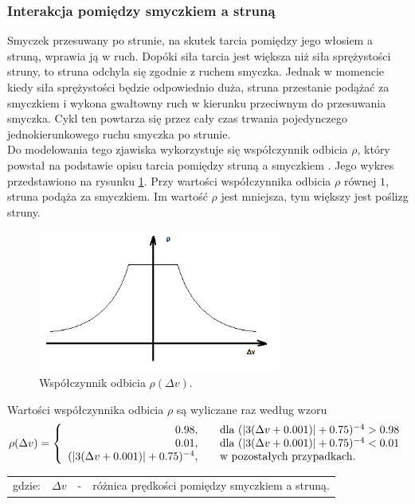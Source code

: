 \subsubsection{Interakcja pomiędzy smyczkiem a struną}
Smyczek przesuwany po strunie, na skutek tarcia pomiędzy jego włosiem a struną, wprawia ją w ruch. Dopóki siła tarcia jest większa niż siła sprężystości struny, to struna odchyla się zgodnie z ruchem smyczka. Jednak w momencie kiedy siła sprężystości będzie odpowiednio duża, struna przestanie podążać za smyczkiem i wykona gwałtowny ruch w kierunku przeciwnym do przesuwania smyczka.  Cykl ten powtarza się przez cały czas trwania pojedynczego jednokierunkowego ruchu smyczka po strunie.  \\
Do modelowania tego zjawiska wykorzystuje się współczynnik odbicia $\rho$, który powstał na podstawie opisu tarcia pomiędzy struną a smyczkiem \cite{bowed_3}. Jego wykres przedstawiono na rysunku \ref{rys:tarcie}. Przy wartości współczynnika odbicia $\rho$ równej $1$, struna podąża za smyczkiem. Im wartość $\rho$ jest mniejsza, tym większy jest poślizg struny.
\begin{figure}[H]
	\centering
	\includegraphics[width=8cm]{grafiki/tarcie2}
	\captionsetup{justification=centering}
	\caption{Współczynnik odbicia $\rho(\Delta v)$.}
	\label{rys:tarcie}
\end{figure}
Wartości współczynnika odbicia $\rho$ są wyliczane raz według wzoru
\begin{equation} \label{equ:model_wsp_odbicia}
\rho(\Delta v) = \left \{\begin{array}{ r l }
0.98, & \quad \text{dla } (|3 (\Delta v + 0.001) | + 0.75)^{-4} > 0.98\\
0.01, & \quad  \text{dla } (|3 (\Delta v + 0.001) | + 0.75)^{-4} < 0.01\\
(|3 (\Delta v + 0.001) | + 0.75)^{-4}, & \quad \text{w pozostałych przypadkach.}
\end{array}
\right.
\end{equation}
\begin{tabular}{ l l l l}
	gdzie: & $\Delta v$ &  - & różnica prędkości pomiędzy smyczkiem a struną.
\end{tabular} \\ \\
